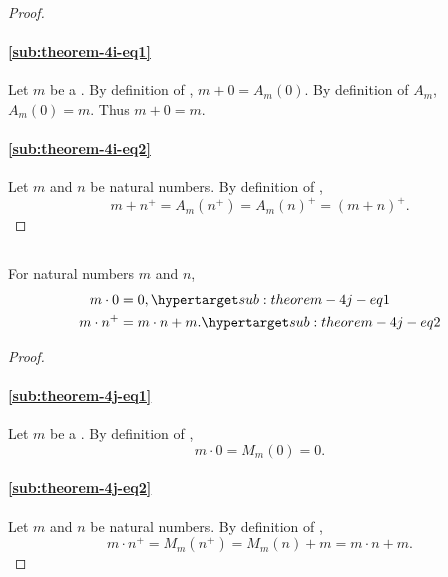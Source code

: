 \documentclass{report}
\begin{document}
\begin{proof}

  \statementpadding



  \paragraph{\eqref{sub:theorem-4i-eq1}}%

    Let $m$ be a .
    By definition of , $m + 0 = A_m(0)$.
    By definition of $A_m$, $A_m(0) = m$.
    Thus $m + 0 = m$.

  \paragraph{\eqref{sub:theorem-4i-eq2}}%

    Let $m$ and $n$ be natural numbers.
    By definition of ,
      $$m + n^+ = A_m(n^+) = A_m(n)^+ = (m + n)^+.$$

\end{proof}

\subsection{}

\begin{theorem}[4J]

  For natural numbers $m$ and $n$,
    \begin{align}
      m \cdot 0 & = 0, \hyperlabel{sub:theorem-4j-eq1} \\
      m \cdot n^+ & = m \cdot n + m. \hyperlabel{sub:theorem-4j-eq2}
    \end{align}

\end{theorem}

\begin{proof}

  \statementpadding



  \paragraph{\eqref{sub:theorem-4j-eq1}}%

    Let $m$ be a .
    By definition of , $$m \cdot 0 = M_m(0) = 0.$$

  \paragraph{\eqref{sub:theorem-4j-eq2}}%

    Let $m$ and $n$ be natural numbers.
    By definition of ,
      $$m \cdot n^+ = M_m(n^+) = M_m(n) + m = m \cdot n + m.$$

\end{proof}
\end{document}
